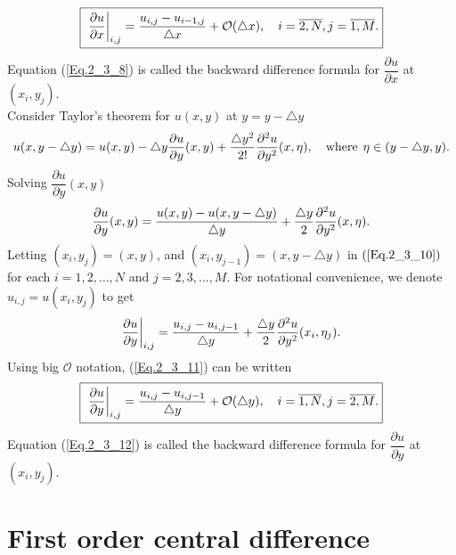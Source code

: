 \begin{align}{\label{Eq.2_3_8}}
\fbox{ $ \displaystyle \dfrac{\partial u}{\partial x}\bigg|_{i,j}= \dfrac{ u_{i,j} - u_{i-1,j}}{\triangle x} + \mathcal{O}(\triangle x),\quad i =\overline{2,N}, j=\overline{1,M}. $}
\end{align}
Equation (\ref{Eq.2_3_8}) is called the backward difference formula for $\dfrac{\partial u}{\partial x }$ at $(x_{i}, y_{j})$.
\\
Consider Taylor's theorem for $u(x,y)$ at $y= y - \triangle y$
\begin{align*}%
u(x, y - \triangle y) = u(x,y) - \triangle y \dfrac{\partial u}{\partial y}(x, y) + \dfrac{\triangle y^{2}}{2!} \dfrac{\partial^2 u}{\partial y^{2}} (x, \eta), \quad \text{where} \hspace{0.15cm}\eta \in (y - \triangle y, y).
\end{align*}
Solving $\dfrac{\partial u}{\partial y}(x, y)$
\begin{align}{\label{Eq.2_3_10}}
\dfrac{\partial u}{\partial y}(x, y) = \dfrac{ u(x,y ) - u(x ,y - \triangle y )  }{\triangle y} +  \dfrac{\triangle y}{2} \dfrac{\partial^2 u}{\partial y^{2}} (x, \eta). 
\end{align}
Letting $(x_{i},y_{j})=(x,y)$, and $(x_{i},y_{j-1})=(x,y -\triangle y )$  in $(\ref{Eq.2_3_10})$ for each $i = 1,2,\dots,N$ and $j = 2,3,\dots,M$. For notational convenience, we denote $u_{i,j}=u(x_{i},y_{j}) $ to get
\begin{align}{\label{Eq.2_3_11}}
\dfrac{\partial u}{\partial y}\bigg|_{i,j} = \dfrac{ u_{i,j} - u_{i,j-1}}{\triangle y} +  \dfrac{\triangle y}{2} \dfrac{\partial^2 u}{\partial y^{2}} (x_{i}, \eta_{j}).
\end{align}
Using big $\mathcal{O}$ notation, (\ref{Eq.2_3_11}) can be written
\begin{align}{\label{Eq.2_3_12}}
\fbox{ $ \displaystyle \dfrac{\partial u}{\partial y}\bigg|_{i,j} = \dfrac{ u_{i,j} - u_{i,j-1}}{\triangle y}  + \mathcal{O}(\triangle y),\quad i =\overline{1,N}, j=\overline{2,M}. $}
\end{align}
Equation (\ref{Eq.2_3_12}) is called the backward difference formula for $\dfrac{\partial u}{\partial y }$ at $(x_{i}, y_{j})$.
\\
\section{First order central difference}

